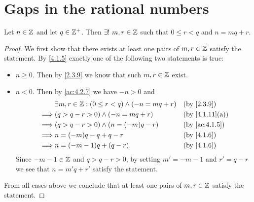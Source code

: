 \section{Gaps in the rational numbers}\label{sec:4.4}

\begin{ac}\label{ac:4.4.1}
  Let \(n \in \mathbb{Z}\) and let \(q \in \mathbb{Z}^+\).
  Then \(\exists!\ m, r \in \mathbb{Z}\) such that \(0 \leq r < q\) and \(n = mq + r\).
\end{ac}

\begin{proof}
  We first show that there exists at least one pairs of \(m, r \in \mathbb{Z}\) satisfy the statement.
  By \cref{4.1.5} exactly one of the following two statements is true:
  \begin{itemize}
    \item \(n \geq 0\).
          Then by \cref{2.3.9} we know that such \(m, r \in \mathbb{Z}\) exist.
    \item \(n < 0\).
          Then by \cref{ac:4.2.7} we have \(-n > 0\) and
          \begin{align*}
                     & \exists m, r \in \Z : (0 \leq r < q) \land (-n = mq + r) &  & \by{2.3.9}                   \\
            \implies & (q > q - r > 0) \land (-n = mq + r)                      &  & \text{(by \cref{4.1.11}(a))} \\
            \implies & (q > q - r > 0) \land (n = (-m)q - r)                    &  & \by{ac:4.1.5}                \\
            \implies & n = (-m)q - q + q - r                                    &  & \by{4.1.6}                   \\
            \implies & n = (-m - 1)q + (q - r).                                 &  & \by{4.1.6}
          \end{align*}
          Since \(-m - 1 \in \mathbb{Z}\) and \(q > q - r > 0\), by setting \(m' = -m - 1\) and \(r' = q - r\) we see that \(n = m'q + r'\) satisfy the statement.
  \end{itemize}
  From all cases above we conclude that at least one pairs of \(m, r \in \mathbb{Z}\) satisfy the statement.


\end{proof}
